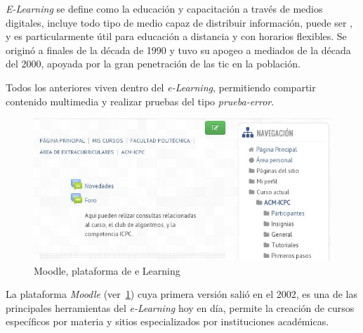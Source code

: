 
\emph{E-Learning} se define como la educación y capacitación a través de medios
digitales, incluye todo tipo de medio capaz de distribuir información, puede ser
, y es
particularmente útil para educación a distancia y con horarios flexibles. Se
originó a finales de la década de 1990 y tuvo su apogeo a mediados de la década
del 2000, apoyada por la gran penetración de las \Gls{tic} en la
población\cite{punie:ict}.

Todos los  anteriores viven dentro del \emph{e-Learning}, permitiendo
compartir contenido multimedia y realizar pruebas del tipo \emph{prueba-error}. 

\begin{figure}[h] \centering \includegraphics[scale=0.5]{tics/moodle.jpg}
	\caption{Moodle, plataforma de e Learning} \label{fig:moodle}
\end{figure}




La plataforma \emph{Moodle} (ver~\ref{fig:moodle}) cuya primera versión salió en
el 2002, es una de las principales herramientas del \emph{e-Learning} hoy en
día, permite la creación de cursos específicos por materia y sitios
especializados por instituciones académicas\cite{perkins2006using}. 

